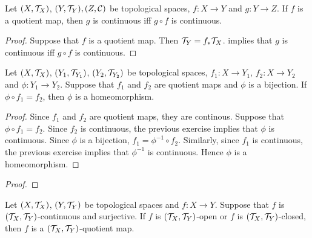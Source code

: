 \documentclass{book}
\begin{document}
	\begin{ex} 
		Let $(X, \mathcal{T}_X)$, $(Y, \mathcal{T}_Y), (Z, \mathcal{C})$ be topological spaces, $f:X \rightarrow Y$ and $g: Y \rightarrow Z$. If $f$ is a quotient map, then $g$ is continuous iff $g \circ f$ is continuous.
	\end{ex}
	
	\begin{proof}
		Suppose that $f$ is a quotient map. Then $\mathcal{T}_Y = f_* \mathcal{T}_X$.  implies that $g$ is continuous iff $g \circ f$ is continuous.
	\end{proof}

	\begin{ex} 
		Let $(X, \mathcal{T}_X)$, $(Y_1, \mathcal{T}_{Y_1})$, $(Y_2, \mathcal{T}_{Y_2})$ be topological spaces, $f_1:X \rightarrow Y_1$, $f_2:X \rightarrow Y_2$ and $\phi: Y_1 \rightarrow Y_2$. Suppose that $f_1$ and $f_2$ are quotient maps and $\phi$ is a bijection. If $\phi \circ f_1 = f_2$, then $\phi$ is a homeomorphism. 
	\end{ex}
	
	\begin{proof}
		Since $f_1$ and $f_2$ are quotient maps, they are continous. Suppose that $\phi \circ f_1 = f_2$. Since $f_2$ is continuous, the previous exercise implies that $\phi$ is continuous. Since $\phi$ is a bijection, $f_1 = \phi^{-1} \circ f_2$. Similarly, since $f_1$ is continuous, the previous exercise implies that $\phi^{-1}$ is continuous. Hence $\phi$ is a homeomorphism.
	\end{proof}

	\begin{ex} 
	\end{ex}

	\begin{proof}
	\end{proof}
	
	\begin{ex} 
	Let $(X, \mathcal{T}_X)$, $(Y, \mathcal{T}_Y)$ be topological spaces and $f:X \rightarrow Y$. Suppose that $f$ is $(\mathcal{T}_X, \mathcal{T}_Y)$-continuous and surjective. If $f$ is $(\mathcal{T}_X, \mathcal{T}_Y)$-open or $f$ is $(\mathcal{T}_X, \mathcal{T}_Y)$-closed, then $f$ is a $(\mathcal{T}_X, \mathcal{T}_Y)$-quotient map. 
	\end{ex}
	
\end{document}
